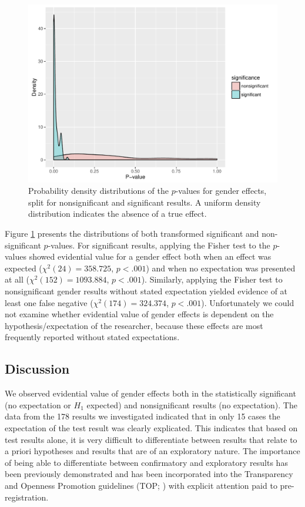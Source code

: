 \documentclass{article}
\begin{document}
\begin{figure}
\begin{center}
\includegraphics{../figures/Fig6.pdf}
\end{center}
\caption{Probability density distributions of the $p$-values for gender effects, split for nonsignificant and significant results. A uniform density distribution indicates the absence of a true effect.}
\label{fig:fig6}
\end{figure}

Figure \ref{fig:fig6} presents the distributions of both transformed significant and non-significant $p$-values. For significant results, applying the Fisher test to the $p$-values showed evidential value for a gender effect both when an effect was expected ($\chi^2(24)=358.725$, $p<.001$) and when no expectation was presented at all ($\chi^2(152)=1093.884$, $p<.001$). Similarly, applying the Fisher test to nonsignificant gender results without stated expectation yielded evidence of at least one false negative ($\chi^2(174)=324.374$, $p<.001$). Unfortunately we could not examine whether evidential value of gender effects is dependent on the hypothesis/expectation of the researcher, because these effects are most frequently reported without stated expectations. 

\subsection*{Discussion}

We observed evidential value of gender effects both in the statistically significant (no expectation or $H_1$ expected) and nonsignificant results (no expectation). The data from the 178 results we investigated indicated that in only 15 cases the expectation of the test result was clearly explicated. This indicates that based on test results alone, it is very difficult to differentiate between results that relate to a priori hypotheses and results that are of an exploratory nature. The importance of being able to differentiate between confirmatory and exploratory results has been previously demonstrated \cite{Wagenmakers2012-jq} and has been incorporated into the Transparency and Openness Promotion guidelines (TOP; \cite{Nosek2015-nr}) with explicit attention paid to pre-registration.
\end{document}
